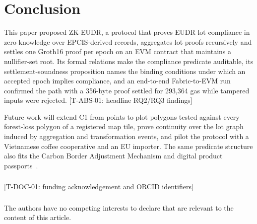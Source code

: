 \documentclass[runningheads]{llncs}
\newif\iffinal
\newcommand{\pending}[2]{\iffinal\errmessage{Unresolved pending result #1}\else{\color{red}[#1: #2]}\fi}
\begin{document}
\section{Conclusion}
\label{sec:conclusion}

This paper proposed ZK-EUDR, a protocol that proves EUDR lot compliance in zero knowledge over EPCIS-derived records, aggregates lot proofs recursively and settles one Groth16 proof per epoch on an EVM contract that maintains a nullifier-set root. Its formal relations make the compliance predicate auditable, its settlement-soundness proposition names the binding conditions under which an accepted epoch implies compliance, and an end-to-end Fabric-to-EVM run confirmed the path with a 356-byte proof settled for 293,364 gas while tampered inputs were rejected. \pending{T-ABS-01}{headline RQ2/RQ3 findings}

Future work will extend C1 from points to plot polygons tested against every forest-loss polygon of a registered map tile, prove continuity over the lot graph induced by aggregation and transformation events, and pilot the protocol with a Vietnamese coffee cooperative and an EU importer. The same predicate structure also fits the Carbon Border Adjustment Mechanism and digital product passports~\cite{abreu2025dpp}.

\begin{credits}
\subsubsection{\ackname} \pending{T-DOC-01}{funding acknowledgement and ORCID identifiers}
\subsubsection{\discintname} The authors have no competing interests to declare that are relevant to the content of this article.
\end{credits}
\end{document}
